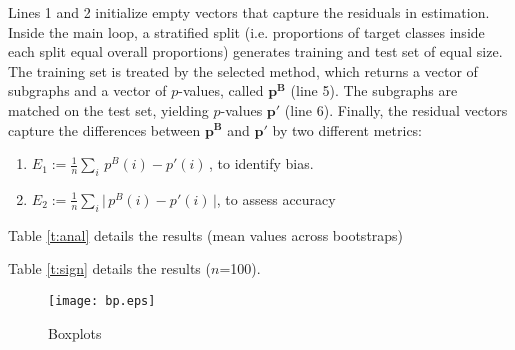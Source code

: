 \documentclass{article}
\begin{document}
Lines 1 and 2 initialize empty vectors that capture the residuals in estimation. Inside the main loop, a stratified split (i.e. proportions of target classes inside each split equal overall proportions) generates training and test set of equal size. The training set is treated by the selected method, which returns a vector of subgraphs and a vector of $p$-values, called $\mathbf{p^B}$ (line 5). The subgraphs are matched on the test set, yielding $p$-values $\mathbf{p'}$ (line 6). Finally, the residual vectors capture the differences between $\mathbf{p^B}$ and  $\mathbf{p'}$ by two different metrics:
\begin{enumerate}
  \item $E_1 := \frac{1}{n} \sum_i \,p^B(i) -p'(i) \,$, to identify bias.
  \item $E_2 := \frac{1}{n} \sum_i \Big|\,p^B(i) -p'(i) \,\Big|$, to assess accuracy
\end{enumerate}

Table \ref{t:anal} details the results (mean values across bootstraps)


Table \ref{t:sign} details the results ($n$=100). 


\begin{figure}[t]
  \begin{center}
    \texttt{[image: bp.eps]}
  \end{center}
  \caption{Boxplots}
  \label{fig:bp}
\end{figure}



\end{document}
